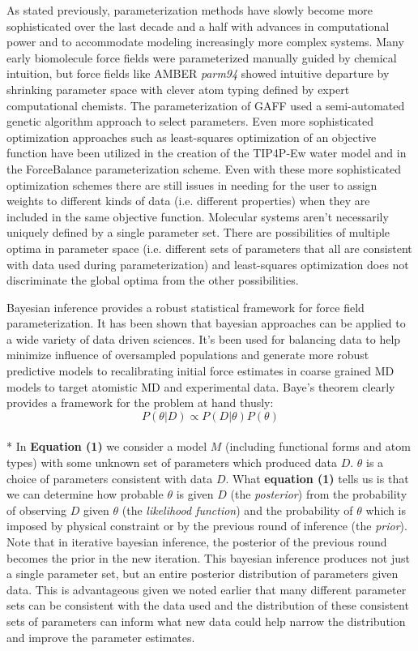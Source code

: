 \documentclass[rmp,nofootinbib,superscriptaddress,12pt,tightenlines,notitlepage]{revtex4-1}
\begin{document}
As stated previously, parameterization methods have slowly become more sophisticated over the last decade and a half with advances in computational power and to accommodate modeling increasingly more complex systems. Many early biomolecule force fields were parameterized manually guided by chemical intuition, but force fields like AMBER \textit{parm94} showed intuitive departure by shrinking parameter space with clever atom typing defined by expert computational chemists.\cite{parm94} The parameterization of GAFF used a semi-automated genetic algorithm approach to select parameters.\cite{amber} Even more sophisticated optimization approaches such as least-squares optimization of an objective function have been utilized in the creation of the TIP4P-Ew water model\cite{tip4pew} and in the ForceBalance parameterization scheme\cite{FB1,FB2,FB3}. Even with these more sophisticated optimization schemes there are still issues in needing for the user to assign weights to different kinds of data (i.e. different properties) when they are included in the same objective function. Molecular systems aren't necessarily uniquely defined by a single parameter set. There are possibilities of multiple optima in parameter space (i.e. different sets of parameters that all are consistent with data used during parameterization) and least-squares optimization does not discriminate the global optima from the other possibilities.

Bayesian inference provides a robust statistical framework for force field parameterization. It has been shown that bayesian approaches can be applied to a wide variety of data driven sciences. It's been used for balancing data to help minimize influence of oversampled populations and generate more robust predictive models\cite{bayes_imbalance} to recalibrating initial force estimates in coarse grained MD models to target atomistic MD and experimental data\cite{bayes_coarse}. Baye's theorem clearly provides a framework for the problem at hand thusly:
\begin{equation} P\left(\theta|D\right) \propto P\left(D|\theta\right) P\left(\theta\right)\end{equation}\\*
In \textbf{Equation (1)} we consider a model $M$ (including functional forms and atom types) with some unknown set of parameters which produced data $D$. $\theta$ is a choice of parameters consistent with data $D$. What \textbf{equation (1)} tells us is that we can determine how probable $\theta$ is given $D$ (the \textit{posterior}) from the probability of observing $D$ given $\theta$ (the \textit{likelihood function}) and the  probability of $\theta$ which is imposed by physical constraint or by the previous round of inference (the \textit{prior}). Note that in iterative bayesian inference, the posterior of the previous round becomes the prior in the new iteration. This bayesian inference produces not just a single parameter set, but an entire posterior distribution of parameters given data. This is advantageous given we noted earlier that many different parameter sets can be consistent with the data used and the distribution of these consistent sets of parameters can inform what new data could help narrow the distribution and improve the parameter estimates. 
\end{document}

